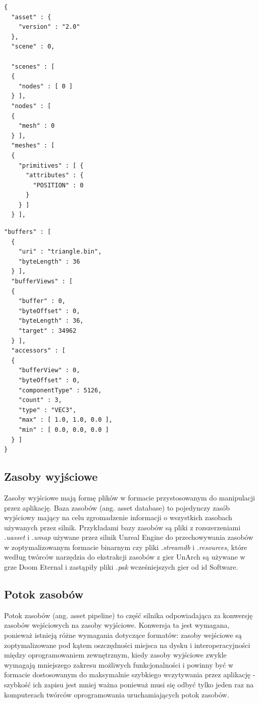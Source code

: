 \noindent\begin{minipage}{.35\textwidth}
\lstset{language=JSON}
\begin{lstlisting}[label={gltfExample}]
{
  "asset" : {
    "version" : "2.0"
  },
  "scene" : 0,
  
  "scenes" : [
  {
    "nodes" : [ 0 ]
  } ],
  "nodes" : [
  {
    "mesh" : 0
  } ],
  "meshes" : [
  {
    "primitives" : [ {
      "attributes" : {
        "POSITION" : 0
      }
    } ]
  } ],
\end{lstlisting}
\end{minipage}\hfill
\begin{minipage}{.55\textwidth}
\lstset{language=JSON}
\begin{lstlisting}[frame=l]
  "buffers" : [
  {
    "uri" : "triangle.bin",
    "byteLength" : 36
  } ],
  "bufferViews" : [
  {
    "buffer" : 0,
    "byteOffset" : 0,
    "byteLength" : 36,
    "target" : 34962
  } ],
  "accessors" : [
  {
    "bufferView" : 0,
    "byteOffset" : 0,
    "componentType" : 5126,
    "count" : 3,
    "type" : "VEC3",
    "max" : [ 1.0, 1.0, 0.0 ],
    "min" : [ 0.0, 0.0, 0.0 ]
  } ]
}
\end{lstlisting}
\end{minipage}

\subsection{Zasoby wyjściowe}

Zasoby wyjściowe mają formę plików w formacie przystosowanym do manipulacji przez aplikację.
Baza zasobów (ang. asset database) to pojedynczy zasób wyjściowy mający na celu zgromadzenie informacji o wszystkich zasobach używanych przez silnik.
Przykładami bazy zasobów są pliki z rozszerzeniami \textit{.uasset} i \textit{.umap} używane przez silnik Unreal Engine \cite{unrealengine} do przechowywania zasobów w zoptymalizowanym formacie binarnym czy pliki \textit{.streamdb} i \textit{.resources}, które według twórców narzędzia do ekstrakcji zasobów z gier UnArch \cite{UNARCH} są używane w grze Doom Eternal i zastąpiły pliki \textit{.pak} wcześniejszych gier od id Software.


\subsection{Potok zasobów}

Potok zasobów (ang. asset pipeline) to część silnika odpowiadająca za konwersję zasobów wejściowych na zasoby wyjściowe.
Konwersja ta jest wymagana, ponieważ istnieją różne wymagania dotyczące formatów: zasoby wejściowe są zoptymalizowane pod kątem oszczędności miejsca na dysku i interoperacyjności między oprogramowaniem zewnętrznym, kiedy zasoby wyjściowe zwykle wymagają mniejszego zakresu możliwych funkcjonalności i powinny być w formacie dostosowanym do maksymalnie szybkiego wczytywania przez aplikację - szybkość ich zapisu jest mniej ważna ponieważ musi się odbyć tylko jeden raz na komputerach twórców oprogramowania uruchamiających potok zasobów.


